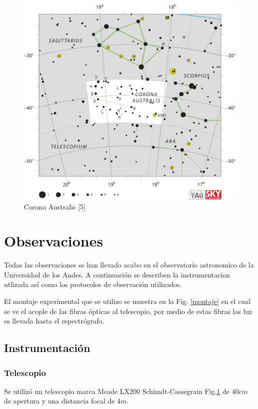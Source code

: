 \documentclass[Proceedings]{ascelike}
\begin{document}
\begin{figure}
\centering
\includegraphics[scale=0.4]{CRA.png}
\caption{Corona Australis [5]\label{la}}
\end{figure}


\section{Observaciones}

Todas las observaciones se han llevado acabo en el observatorio astronomico de la 
Universidad de los Andes. A continuaci\'on se describen la instrumentacion utlizada
as\'i como los protocolos de observaci\'on utilizados.

El montaje experimental que se utilizo se muestra en la Fig. \ref{montaje} en el cual se ve el acople
de las fibras \'opticas al telescopio, por medio de estas fibras las luz es llevada hasta
el espectr\'ografo.

\subsection{Instrumentaci\'on}

\subsubsection{Telescopio}

Se utiliz\'o un telescopio marca Meade LX200 Schimdt-Cassegrain Fig.\ref{la} de $40 cm$ de apertura y una
distancia focal de $4m$.
\end{document}
